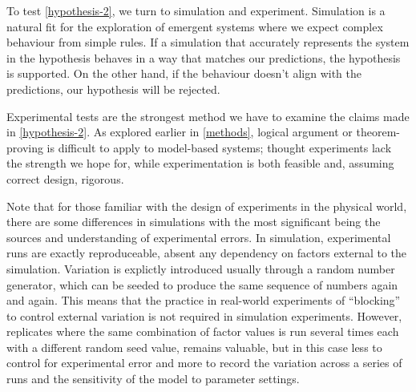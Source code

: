 To test \cref{hypothesis-2}, we turn to simulation and experiment. Simulation is a natural fit for the exploration of emergent systems where we expect complex behaviour from simple rules. If a simulation that accurately represents the system in the hypothesis behaves in a way that matches our predictions, the hypothesis is supported. On the other hand, if the behaviour doesn't align with the predictions, our hypothesis will be rejected.

Experimental tests are the strongest method we have to examine the claims made in \cref{hypothesis-2}. As explored earlier in \cref{methods}, logical argument or theorem-proving is difficult to apply to model-based systems; thought experiments lack the strength we hope for, while experimentation is both feasible and, assuming correct design, rigorous.

Note that for those familiar with the design of experiments in the physical world, there are some differences in simulations with the most significant being the sources and understanding of experimental errors. In simulation, experimental runs are exactly reproduceable, absent any dependency on factors external to the simulation. Variation is explictly introduced usually through a random number generator, which can be seeded to produce the same sequence of numbers again and again. This means that the practice in real-world experiments of ``blocking'' to control external variation is not required in simulation experiments. However, \gls{replicate}s where the same combination of factor values is run several times each with a different random seed value, remains valuable, but in this case less to control for experimental error and more to record the variation across a series of runs and the sensitivity of the model to parameter settings.
